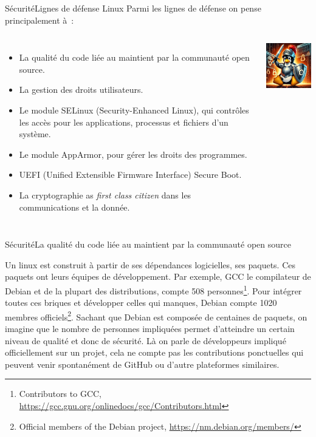 \documentclass{beamer}
\begin{document}
    \begin{frame}{Sécurité}{Lignes de défense Linux}
        Parmi les lignes de défense on pense principalement à~:
        \begin{columns}
            \begin{itemize}
                \item La qualité du code liée au maintient par la communauté open source.
                \item La gestion des droits utilisateurs.
                \item Le module SELinux (Security-Enhanced Linux), qui contrôles les accès pour les applications, processus et fichiers d'un système.
                \item Le module AppArmor, pour gérer les droits des programmes.
                \item UEFI (Unified Extensible Firmware Interface) Secure Boot.
                \item La cryptographie as \textit{first class citizen} dans les communications et la donnée.
            \end{itemize}
            \centering
            \includegraphics[width=4cm]{image/tux-fighting-attack}
        \end{columns}
    \end{frame}

    \begin{frame}{Sécurité}{La qualité du code liée au maintient par la communauté open source}
        \begin{footnotesize}
            Un linux est construit à partir de ses dépendances logicielles, ses paquets.
            \bigbreak
            Ces paquets ont leurs équipes de développement.
            Par exemple, GCC le compilateur de Debian et de la plupart des distributions, compte 508 personnes\footnote{Contributors to GCC, \url{https://gcc.gnu.org/onlinedocs/gcc/Contributors.html}}.
            \bigbreak
            Pour intégrer toutes ces briques et développer celles qui manques, Debian compte 1020 membres officiels\footnote{Official members of the Debian project, \url{https://nm.debian.org/members/}}.
            \bigbreak
            Sachant que Debian est composée de centaines de paquets, on imagine que le nombre de personnes impliquées permet d'atteindre un certain niveau de qualité et donc de sécurité.
            \bigbreak
            Là on parle de développeurs impliqué officiellement sur un projet, cela ne compte pas les contributions ponctuelles qui peuvent venir spontanément de GitHub ou d'autre plateformes similaires.
        \end{footnotesize}
    \end{frame}
\end{document}

